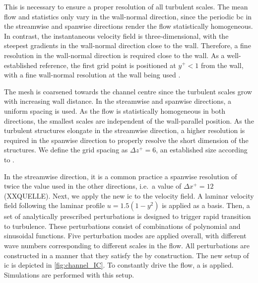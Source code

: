 This is necessary to ensure a proper resolution of all turbulent scales.
The mean flow and statistics only vary in the wall-normal direction, since the periodic \acrshort{bc} in the streamwise and spanwise directions render the flow statistically homogeneous.
In contrast, the instantaneous velocity field is three-dimensional, with the steepest gradients in the wall-normal direction close to the wall.
Therefore, a fine resolution in the wall-normal direction is required close to the wall.
As a well-established reference, the first grid point is positioned at $y^+<1$ from the wall, with a fine wall-normal resolution at the wall being used
 \citep{schlatter_assessment_2010}.

The mesh is coarsened towards the channel centre since the turbulent scales grow with increasing wall distance.
In the streamwise and spanwise directions, a uniform spacing is used. 
As the flow is statistically homogeneous in both directions, the smallest scales are independent of the wall-parallel position.
As the turbulent structures elongate in the streamwise direction, a higher resolution is required in the spanwise direction to properly resolve the short dimension of the structures.
We define the grid spacing as $\Delta z^+= 6$, an established size according to \citep{pope_turbulent_2015}.

In the streamwise direction, it is a common practice a spanwise resolution of twice the value used in the other directions, i.e.~a value of $\Delta x^+= 12$ (XXQUELLE). 
Next, we apply the new \acrshort{ic} to the velocity field.
A laminar velocity field following the laminar profile $u = 1.5(1-y^2)$ is applied as a basis.
Then, a set of analytically prescribed perturbations is designed to trigger rapid transition to turbulence.
These perturbations consist of combinations of polynomial and sinusoidal functions.
Five perturbation modes are applied overall, with different wave numbers corresponding to different scales in the flow.
All perturbations are constructed in a manner that they satisfy the  by construction.
The new setup of \acrshort{ic} is depicted in \autoref{fig:channel_IC}.
To constantly drive the flow, a  is applied. 
Simulations are performed with this setup.



